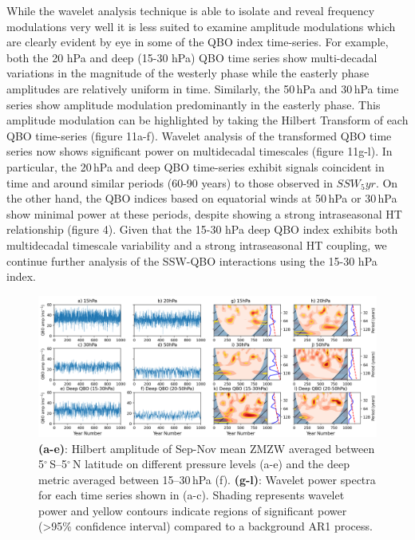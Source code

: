 \documentclass[wcd, manuscript]{copernicus}
\begin{document}

While the wavelet analysis technique is able to isolate and reveal frequency modulations very well it is less suited to examine amplitude modulations which are clearly evident by eye in some of the QBO index time-series. For example, both the 20 hPa and deep (15-30 hPa) QBO time series show multi-decadal variations in the magnitude of the westerly phase while the easterly phase amplitudes are relatively uniform in time. Similarly, the 50\,hPa and 30\,hPa time series show amplitude modulation predominantly in the easterly phase. This amplitude modulation can be highlighted by taking the Hilbert Transform of each QBO time-series (figure 11a-f). Wavelet analysis of the transformed QBO time series now shows significant power on multidecadal timescales (figure 11g-l). In particular, the 20\,hPa and deep QBO time-series exhibit signals coincident in time and around similar periods (60-90 years) to those observed in $SSW_5yr$. On the other hand, the QBO indices based on equatorial winds at 50\,hPa or 30\,hPa show minimal power at these periods, despite showing a strong intraseasonal HT relationship (figure 4). Given that the 15-30 hPa deep QBO  index exhibits  both multidecadal timescale variability and a strong intraseasonal HT coupling, we continue further analysis of the SSW-QBO interactions using the 15-30 hPa index. 

\begin{center}
\begin{figure}[h!]
\includegraphics[width = \linewidth]{figures/QBO_levels_amp.png}
\caption{\textbf{(a-e)}: Hilbert amplitude of Sep-Nov mean ZMZW averaged between 5$^\circ$\,S--5$^\circ$\,N latitude on different pressure levels (a-e) and the deep metric averaged between 15--30\,hPa (f). \textbf{(g-l)}: Wavelet power spectra for each time series shown in (a-c). Shading represents wavelet power and yellow contours indicate regions of significant power (>95\% confidence interval) compared to a background AR1 process.}
\label{fig1}
\end{figure}
\end{center}
\end{document}
